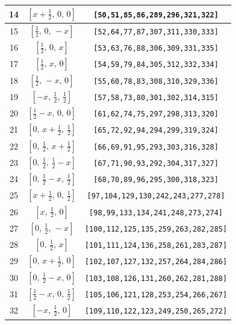 \documentclass[fleqn,8pt]{jsarticle}
\begin{document}
\begin{longtable}{ccc}
14 & $\left[ x + \frac{1}{2},\, 0,\, 0 \right]$ & {\tt [50,51,85,86,289,296,321,322]} \\ \hline
15 & $\left[ \frac{1}{2},\, 0,\, - x \right]$ & {\tt [52,64,77,87,307,311,330,333]} \\ \hline
16 & $\left[ \frac{1}{2},\, 0,\, x \right]$ & {\tt [53,63,76,88,306,309,331,335]} \\ \hline
17 & $\left[ \frac{1}{2},\, x,\, 0 \right]$ & {\tt [54,59,79,84,305,312,332,334]} \\ \hline
18 & $\left[ \frac{1}{2},\, - x,\, 0 \right]$ & {\tt [55,60,78,83,308,310,329,336]} \\ \hline
19 & $\left[ - x,\, \frac{1}{2},\, \frac{1}{2} \right]$ & {\tt [57,58,73,80,301,302,314,315]} \\ \hline
20 & $\left[ \frac{1}{2} - x,\, 0,\, 0 \right]$ & {\tt [61,62,74,75,297,298,313,320]} \\ \hline
21 & $\left[ 0,\, x + \frac{1}{2},\, \frac{1}{2} \right]$ & {\tt [65,72,92,94,294,299,319,324]} \\ \hline
22 & $\left[ 0,\, \frac{1}{2},\, x + \frac{1}{2} \right]$ & {\tt [66,69,91,95,293,303,316,328]} \\ \hline
23 & $\left[ 0,\, \frac{1}{2},\, \frac{1}{2} - x \right]$ & {\tt [67,71,90,93,292,304,317,327]} \\ \hline
24 & $\left[ 0,\, \frac{1}{2} - x,\, \frac{1}{2} \right]$ & {\tt [68,70,89,96,295,300,318,323]} \\ \hline
25 & $\left[ x + \frac{1}{2},\, 0,\, \frac{1}{2} \right]$ & {\tt [97,104,129,130,242,243,277,278]} \\ \hline
26 & $\left[ x,\, \frac{1}{2},\, 0 \right]$ & {\tt [98,99,133,134,241,248,273,274]} \\ \hline
27 & $\left[ 0,\, \frac{1}{2},\, - x \right]$ & {\tt [100,112,125,135,259,263,282,285]} \\ \hline
28 & $\left[ 0,\, \frac{1}{2},\, x \right]$ & {\tt [101,111,124,136,258,261,283,287]} \\ \hline
29 & $\left[ 0,\, x + \frac{1}{2},\, 0 \right]$ & {\tt [102,107,127,132,257,264,284,286]} \\ \hline
30 & $\left[ 0,\, \frac{1}{2} - x,\, 0 \right]$ & {\tt [103,108,126,131,260,262,281,288]} \\ \hline
31 & $\left[ \frac{1}{2} - x,\, 0,\, \frac{1}{2} \right]$ & {\tt [105,106,121,128,253,254,266,267]} \\ \hline
32 & $\left[ - x,\, \frac{1}{2},\, 0 \right]$ & {\tt [109,110,122,123,249,250,265,272]} \\ \hline

\end{longtable}
\end{document}
